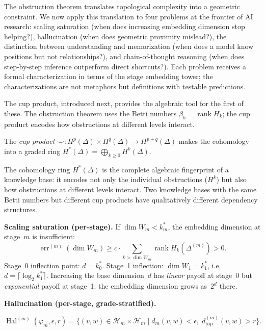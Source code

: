 The obstruction theorem translates topological complexity into a geometric constraint. We now apply this translation to four problems at the frontier of AI research: scaling saturation (when does increasing embedding dimension stop helping?), hallucination (when does geometric proximity mislead?), the distinction between understanding and memorization (when does a model know positions but not relationships?), and chain-of-thought reasoning (when does step-by-step inference outperform direct shortcuts?). Each problem receives a formal characterization in terms of the stage embedding tower; the characterizations are not metaphors but definitions with testable predictions.

The cup product, introduced next, provides the algebraic tool for the first of these. The obstruction theorem uses the Betti numbers $\beta_k = \operatorname{rank} H_k$; the cup product encodes how obstructions at different levels interact.

\begin{definition}
\label{def:cup-product}
The \emph{cup product} $\smile: H^p(\Delta) \times H^q(\Delta) \to H^{p+q}(\Delta)$ makes the cohomology into a graded ring $H^*(\Delta) = \bigoplus_{k \geq 0} H^k(\Delta)$.
\end{definition}

The cohomology ring $H^*(\Delta)$ is the complete algebraic fingerprint of a knowledge base: it encodes not only the individual obstructions ($H^k$) but also how obstructions at different levels interact. Two knowledge bases with the same Betti numbers but different cup products have qualitatively different dependency structures.

\medskip

\textbf{Scaling saturation (per-stage).} If $\dim W_m < k_m^*$, the embedding dimension at stage~$m$ is insufficient:
\[
  \operatorname{err}^{(m)}(\dim W_m) \geq c \cdot \sum_{k > \dim W_m} \operatorname{rank} H_k(\Delta^{(m)}) > 0.
\]
Stage~0 inflection point: $d = k_0^*$. Stage~1 inflection: $\dim W_1 = k_1^*$, i.e.\ $d = \lceil \log_2 k_1^* \rceil$. Increasing the base dimension~$d$ has \emph{linear} payoff at stage~0 but \emph{exponential} payoff at stage~1: the embedding dimension grows as~$2^d$ there.

\medskip

\textbf{Hallucination (per-stage, grade-stratified).}

\begin{definition}
\[
  \operatorname{Hal}^{(m)}(\varphi_m, \epsilon, r) = \{(v,w) \in \mathcal{H}_m \times \mathcal{H}_m \mid d_m(v,w) < \epsilon, \; d_{\mathrm{top}}^{(m)}(v,w) > r\}.
\]
\end{definition}

